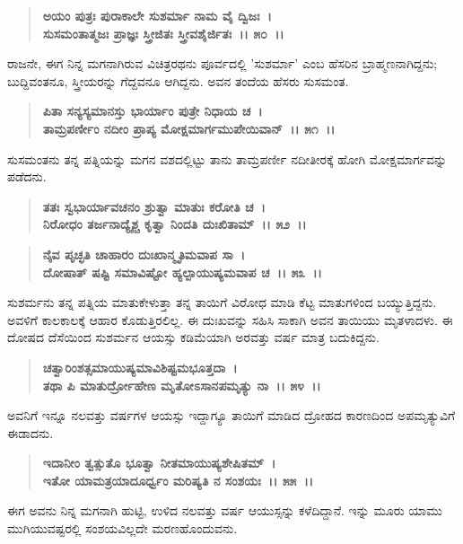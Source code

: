 \begin{verse}
\textbf{ಅಯಂ ಪುತ್ರಃ ಪುರಾಕಾಲೇ ಸುಶರ್ಮಾ ನಾಮ ವೈ ದ್ವಿಜಃ~।}\\\textbf{ಸುಸಮಂತಾತ್ಮಜಃ ಪ್ರಾಜ್ಞಃ ಸ್ತ್ರೀಜಿತಃ ಸ್ತ್ರೀವಶೈರ್ಜಿತಃ~।। ೫೦~।।}
\end{verse}

ರಾಜನೇ, ಈಗ ನಿನ್ನ ಮಗನಾಗಿರುವ ವಿಚಿತ್ರರಥನು ಪೂರ್ವದಲ್ಲಿ 'ಸುಶರ್ಮಾ' ಎಂಬ ಹೆಸರಿನ ಬ್ರಾಹ್ಮಣನಾಗಿದ್ದನು; ಬುದ್ದಿವಂತನೂ, ಸ್ತ್ರೀಯರನ್ನು ಗೆದ್ದವನೂ ಆಗಿದ್ದನು. ಅವನ ತಂದೆಯ ಹೆಸರು ಸುಸಮಂತ.

\begin{verse}
\textbf{ಪಿತಾ ಸನ್ಯಸ್ಯಮಾನಸ್ತು ಭಾರ್ಯಾಂ ಪುತ್ರೇ ನಿಧಾಯ ಚ~।}\\\textbf{ತಾಮ್ರಪರ್ಣೀಂ ನದೀಂ ಪ್ರಾಪ್ಯ ಮೋಕ್ಷಮಾರ್ಗಮುಪೇಯಿವಾನ್~।। ೫೧~।।}
\end{verse}

ಸುಸಮಂತನು ತನ್ನ ಪತ್ನಿಯನ್ನು ಮಗನ ವಶದಲ್ಲಿಟ್ಟು ತಾನು ತಾಮ್ರಪರ್ಣೀ ನದೀತೀರಕ್ಕೆ ಹೋಗಿ ಮೋಕ್ಷಮಾರ್ಗವನ್ನು ಪಡೆದನು.

\begin{verse}
\textbf{ತತಃ ಸ್ವಭಾರ್ಯಾವಚನಂ ಶ್ರುತ್ವಾ ಮಾತುಃ ಕರೋತಿ ಚ~।}\\\textbf{ನಿರೋಧಂ ತರ್ಜನಾದ್ಯೈಶ್ಚ ಕೃತ್ವಾ ನಿಂದತಿ ದುಃಖಿತಾಮ್~।। ೫೨~।। }
\end{verse}

\begin{verse}
\textbf{ನೈವ ಪೃಚ್ಛತಿ ಚಾಹಾರಂ ದುಃಖಾನ್ಮೃತಿಮವಾಪ ಸಾ~।}\\\textbf{ದೋಷಾತ್ ಷಷ್ಟಿ ಸಮಾವಿಷ್ಟೋ ಹ್ಯಲ್ಪಾಯುಷ್ಯಮವಾಪ ಚ~।। ೫೩~।।}
\end{verse}

ಸುಶರ್ಮನು ತನ್ನ ಪತ್ನಿಯ ಮಾತುಕೇಳುತ್ತಾ ತನ್ನ ತಾಯಿಗೆ ವಿರೋಧ ಮಾಡಿ ಕೆಟ್ಟ ಮಾತುಗಳಿಂದ ಬಯ್ಯುತ್ತಿದ್ದನು. ಅವಳಿಗೆ ಕಾಲಕಾಲಕ್ಕೆ ಆಹಾರ ಕೊಡುತ್ತಿರಲಿಲ್ಲ. ಈ ದುಃಖವನ್ನು ಸಹಿಸಿ ಸಾಕಾಗಿ ಅವನ ತಾಯಿಯು ಮೃತಳಾದಳು. ಈ ದೋಷದ ದೆಸೆಯಿಂದ ಸುಶರ್ಮನ ಆಯಸ್ಸು ಕಡಿಮೆಯಾಗಿ ಅರವತ್ತು ವರ್ಷ ಮಾತ್ರ ಬದುಕಿದ್ದನು.

\begin{verse}
\textbf{ಚತ್ವಾರಿಂಶತ್ಸಮಾಯುಷ್ಯಮಾವಿಶಿಷ್ಟಮಭೂತ್ತದಾ~।}\\\textbf{ತಥಾ ಪಿ ಮಾತುರ್ದ್ರೋಹೇಣ ಮೃತೋಽಸಾನಪಮೃತ್ಯು ನಾ~।। ೫೪~।।}
\end{verse}

ಅವನಿಗೆ ಇನ್ನೂ ನಲವತ್ತು ವರ್ಷಗಳ ಆಯಸ್ಸು ಇದ್ದಾಗ್ಯೂ ತಾಯಿಗೆ ಮಾಡಿದ ದ್ರೋಹದ ಕಾರಣದಿಂದ ಅಪಮೃತ್ಯುವಿಗೆ ಈಡಾದನು.

\begin{verse}
\textbf{ಇದಾನೀಂ ತ್ವತ್ಸುತೊ ಭೂತ್ವಾ ನೀತಮಾಯುಷ್ಯಶೇಷಿತಮ್~।}\\\textbf{ಇತೋ ಯಾಮತ್ರಯಾದೂರ್ಧ್ವಂ ಮರಿಷ್ಯತಿ ನ ಸಂಶಯಃ~।। ೫೫~।।}
\end{verse}

ಈಗ ಅವನು ನಿನ್ನ ಮಗನಾಗಿ ಹುಟ್ಟಿ, ಉಳಿದ ನಲವತ್ತು ವರ್ಷ ಆಯುಸ್ಸನ್ನು ಕಳೆದಿದ್ದಾನೆ. ಇನ್ನು ಮೂರು ಯಾಮು ಮುಗಿಯುವಷ್ಟರಲ್ಲಿ ಸಂಶಯವಿಲ್ಲದೇ ಮರಣಹೊಂದುವನು.

